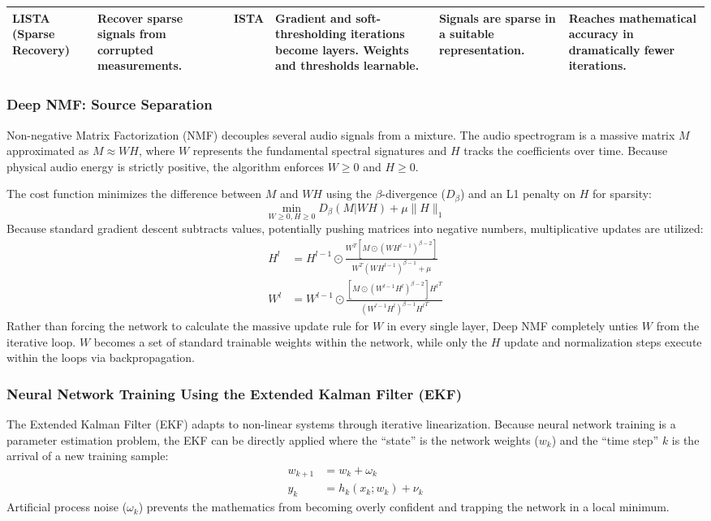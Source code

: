 \documentclass[conference]{IEEEtran}
\begin{document}
\begin{table}[t!]
\begin{tabular}{|p{2.5cm}|p{2.5cm}|p{2.5cm}|p{2.5cm}|p{2.5cm}|p{2.5cm}|}
\textbf{LISTA (Sparse Recovery)} & Recover sparse signals from corrupted measurements. & ISTA & Gradient and soft-thresholding iterations become layers. Weights and thresholds learnable. & Signals are sparse in a suitable representation. & Reaches mathematical accuracy in dramatically fewer iterations. \\ \hline
\end{tabular}
\label{tab:architecture_comparison}
\end{table}


\subsubsection{Deep NMF: Source Separation}
Non-negative Matrix Factorization (NMF) decouples several audio signals from a mixture. The audio spectrogram is a massive matrix $M$ approximated as $M \approx WH$, where $W$ represents the fundamental spectral signatures and $H$ tracks the coefficients over time. Because physical audio energy is strictly positive, the algorithm enforces $W \ge 0$ and $H \ge 0$.

The cost function minimizes the difference between $M$ and $WH$ using the $\beta$-divergence ($D_\beta$) and an L1 penalty on $H$ for sparsity:
\begin{equation}
\min_{W \ge 0, H \ge 0} D_\beta(M | WH) + \mu\|H\|_1
\end{equation}
Because standard gradient descent subtracts values, potentially pushing matrices into negative numbers, multiplicative updates are utilized:
\begin{align}
H^l &= H^{l-1} \odot \frac{W^T [M \odot (WH^{l-1})^{\beta-2}]}{W^T (WH^{l-1})^{\beta-1} + \mu} \\
W^l &= W^{l-1} \odot \frac{[M \odot (W^{l-1}H^l)^{\beta-2}] {H^l}^T}{(W^{l-1}H^l)^{\beta-1} {H^l}^T}
\end{align}
Rather than forcing the network to calculate the massive update rule for $W$ in every single layer, Deep NMF completely unties $W$ from the iterative loop. $W$ becomes a set of standard trainable weights within the network, while only the $H$ update and normalization steps execute within the loops via backpropagation.



\subsubsection{Neural Network Training Using the Extended Kalman Filter (EKF)}
The Extended Kalman Filter (EKF) adapts to non-linear systems through iterative linearization. Because neural network training is a parameter estimation problem, the EKF can be directly applied where the ``state'' is the network weights ($w_k$) and the ``time step'' $k$ is the arrival of a new training sample:
\begin{align}
w_{k+1} &= w_k + \omega_k \\
y_k &= h_k(x_k; w_k) + \nu_k
\end{align}
Artificial process noise ($\omega_k$) prevents the mathematics from becoming overly confident and trapping the network in a local minimum.
\end{document}
